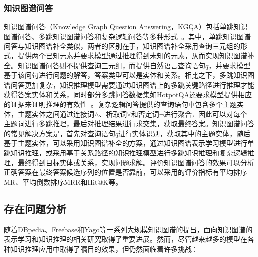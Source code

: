 \documentclass[algorithmlist, AutoFakeBold, AutoFakeSlant, figurelist, tablelist, nomlist, engineering]{seuthesix}
\begin{document}
\subsubsection{知识图谱问答}
知识图谱问答（Knowledge Graph Question Answering，KGQA）包括单跳知识图谱问答、多跳知识图谱问答和复杂逻辑问答等多种形式~\cite{saxena2020improving}。其中，单跳知识图谱问答与知识图谱补全类似，两者的区别在于，知识图谱补全采用查询三元组的形式，提供两个已知元素并要求模型通过推理得到未知的元素，从而实现知识图谱补全。知识图谱问答则不提供查询三元组，而提供自然语言查询语句$q$，并要求模型基于该问句进行问题的解答，答案类型可以是实体和关系。相比之下，多跳知识图谱问答更加复杂，知识推理模型需要通过知识图谱上的多跳关键路径进行推理才能获得答案实体和关系，同时部分多跳问答数据集如HotpotQA还要求模型提供相应的证据来证明推理的有效性~\cite{yang2018hotpotqa}。复杂逻辑问答提供的查询语句中包含多个主题实体，主题实体之间通过连接词$\land$、析取词$\vee$和否定词$\neg$进行聚合，因此可以对每个主题词进行多跳推理，最后对推理结果进行求交集，获取最终答案。知识图谱问答的常见解决方案是，首先对查询语句$q$进行实体识别，获取其中的主题实体，随后基于主题实体，可以采用知识图谱补全的方案，通过知识图谱表示学习模型进行单跳知识推理，或采用基于关系路径的知识推理模型进行多跳知识推理和复杂逻辑推理，最终得到目标实体或关系，实现问题求解。评价知识图谱问答的效果可以分析正确答案在最终答案候选序列的位置是否靠前，可以采用的评价指标有平均排序MR、平均倒数排序MRR和Hit@K等。


\subsection{存在问题分析}
随着DBpedia、Freebase和Yago等一系列大规模知识图谱的提出，面向知识图谱的表示学习和知识推理的相关研究取得了重要进展。然而，尽管越来越多的模型在各种知识推理应用中取得了瞩目的效果，但仍然面临着许多挑战：
\end{document}
